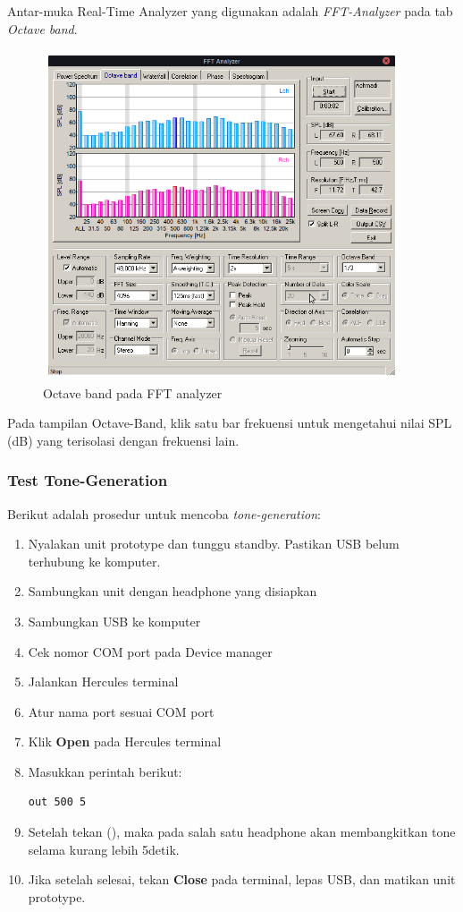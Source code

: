 \documentclass[12pt,]{article}
\begin{document}
	Antar-muka Real-Time Analyzer yang digunakan adalah \textit{FFT-Analyzer} pada tab \textit{Octave band}.
	
	\begin{figure}[!ht]
		\centering
		\includegraphics[width=300pt]{images/kemar/fft}
		\caption{Octave band pada FFT analyzer}
	\end{figure}

	Pada tampilan Octave-Band, klik satu bar frekuensi untuk mengetahui nilai SPL (dB)
	yang terisolasi dengan frekuensi lain.
	
	\newpage
	\subsubsection{Test Tone-Generation}
	Berikut adalah prosedur untuk mencoba \textit{tone-generation}:
	\begin{enumerate}
		\item Nyalakan unit prototype dan tunggu standby.
		Pastikan USB belum terhubung ke komputer.
		\item Sambungkan unit dengan headphone yang disiapkan
		\item Sambungkan USB ke komputer
		\item Cek nomor COM port pada Device manager
		\item Jalankan Hercules terminal
		\item Atur nama port sesuai COM port
		\item Klik \textbf{Open} pada Hercules terminal
		\item Masukkan perintah berikut:
		\begin{verbatim}
out 500 5
		\end{verbatim}
		\item Setelah tekan (\keys{\return}), maka pada salah satu headphone
		akan membangkitkan tone selama kurang lebih 5detik.
		\item Jika setelah selesai, tekan \textbf{Close} pada terminal,
		lepas USB, dan matikan unit prototype.

	\end{enumerate}
\end{document}
